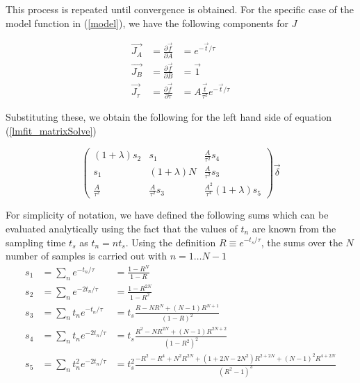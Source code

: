 This process is repeated until convergence is obtained. For the specific case of the model function in (\ref{model}), we have the following components for $J$

\begin{eqnarray}
	\vec{J_A} &= \frac{\partial \vec{f}}{\partial A} &= e^{-\vec{t}/\tau} \\
	\vec{J_B} &= \frac{\partial \vec{f}}{\partial B} &= \vec{1} \\
	\vec{J_\tau} &= \frac{\partial \vec{f}}{\partial \tau} &= A\frac{\vec{t}}{\tau^2}e^{-\vec{t}/\tau} 
\end{eqnarray}

Substituting these, we obtain the following for the left hand side of equation (\ref{lmfit_matrixSolve})

\begin{equation*}
	\begin{pmatrix}
		(1+\lambda)s_2 & s_1 & \frac{A}{\tau^2}s_4 \\ 
		s_1 & (1+\lambda)N & \frac{A}{\tau^2}s_3 \\ 
		\frac{A}{\tau^2} & \frac{A}{\tau^2}s_3 & \frac{A^2}{\tau^4}(1+\lambda)s_5
	\end{pmatrix} \vec{\delta}
\end{equation*}

For simplicity of notation, we have defined the following sums which can be evaluated analytically using the fact that the values of $t_n$ are known from the sampling time $t_s$ as $t_n = n t_s$. Using the definition $R \equiv e^{-t_s/\tau}$, the sums over the $N$ number of samples is carried out with $n=1\ldots N-1$
\begin{eqnarray}
	s_1 &= \sum_n e^{-t_n/\tau} &= \frac{1-R^N}{1-R} \\
	s_2 &= \sum_n e^{-2t_n/\tau} &= \frac{1-R^{2N}}{1-R^2} \\
	s_3 &= \sum_n t_n e^{-t_n/\tau} &= t_s \frac{R - N R^N + (N-1) R^{N+1}}{(1-R)^2} \\
	s_4 &= \sum_n t_n e^{-2t_n/\tau} &= t_s \frac{R^2 - NR^{2N} + (N-1) R^{2N+2}}{(1-R^2)^2} \\
	s_5 &= \sum_n t_n^2 e^{-2t_n/\tau} &= t_s^2 \frac{-R^2 - R^4 +N^2R^{2N} + (1+2N-2N^2)R^{2+2N}+(N-1)^2 R^{4+2N}}{(R^2-1)^3} \nonumber \\
\end{eqnarray}

